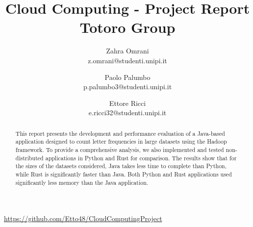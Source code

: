 \documentclass{article}
\title{Cloud Computing - Project Report \\ \small{Totoro Group}}
\author{
    Zahra Omrani \\ z.omrani@studenti.unipi.it \and 
    Paolo Palumbo \\ p.palumbo3@studenti.unipi.it \and
    Ettore Ricci \\ e.ricci32@studenti.unipi.it}
\begin{document}
\maketitle
\begin{center}
    \scriptsize
    \href{https://github.com/Etto48/CloudComputingProject}{https://github.com/Etto48/CloudComputingProject}
\end{center}

\begin{abstract}
    This report presents the development and performance evaluation of a Java-based application 
    designed to count letter frequencies in large datasets using the Hadoop framework. 
    To provide a comprehensive analysis, we also implemented and tested non-distributed 
    applications in Python and Rust for comparison.
    The results show that for the sizes of the datasets considered, Java takes less time to complete 
    than Python, while Rust is significantly faster than Java. 
    Both Python and Rust applications used significantly less memory than the Java application.
\end{abstract}
\end{document}
